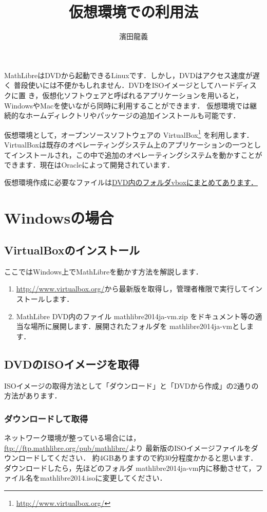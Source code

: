 \documentclass[a4j]{jsarticle}
\title{仮想環境での利用法}
\author{濱田龍義}
\newcommand{\vm}{mathlibre2014ja-vm}
\begin{document}
\maketitle
MathLibreはDVDから起動できるLinuxです．しかし，DVDはアクセス速度が遅く
普段使いには不便かもしれません．DVDをISOイメージとしてハードディスクに置
き，仮想化ソフトウェアと呼ばれるアプリケーションを用いると，
WindowsやMacを使いながら同時に利用することができます．
仮想環境では継続的なホームディレクトリやパッケージの追加インストールも可能です．

仮想環境として，オープンソースソフトウェアの VirtualBox\footnote{\url{http://www.virtualbox.org/}} を利用します．
VirtualBoxは既存のオペレーティングシステム上のアプリケーションの一つとし
てインストールされ，この中で追加のオペレーティングシステムを動かすことが
できます．現在はOracleによって開発されています．

仮想環境作成に必要なファイルは\underline{DVD内のフォルダvboxにまとめてあります．}

\section{Windowsの場合}
\subsection{VirtualBoxのインストール}
ここではWindows上でMathLibreを動かす方法を解説します．
\begin{enumerate}
 \item \url{http://www.virtualbox.org/}から最新版を取得し，管理者権限で実行してインストールします．
 \item MathLibre DVD内のファイル \vm.zip をドキュメント等の適当な場所に展開します．展開されたフォルダを \vm とします．
\end{enumerate}

\subsection{DVDのISOイメージを取得}
ISOイメージの取得方法として「ダウンロード」と「DVDから作成」の2通りの方法があります．
\subsubsection{ダウンロードして取得}
ネットワーク環境が整っている場合には，
\url{ftp://ftp.mathlibre.org/pub/mathlibre/}より
最新版のISOイメージファイルをダウンロードしてください．
約4GBありますので約30分程度かかると思います．
ダウンロードしたら，先ほどのフォルダ \vm 内に移動させて，ファイル名をmathlibre2014.isoに変更してください．
\end{document}
